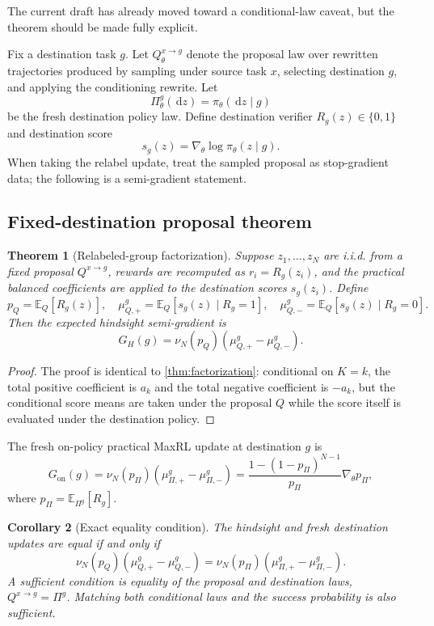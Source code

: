 \documentclass[11pt]{article}
\newcommand{\E}{\mathbb{E}}
\newcommand{\grad}{\nabla_{\!\theta}}
\newcommand{\dd}{\,\mathrm{d}}
\newtheorem{theorem}{Theorem}[section]
\newtheorem{corollary}[theorem]{Corollary}
\theoremstyle{definition}
\theoremstyle{remark}
\begin{document}
The current draft has already moved toward a conditional-law caveat, but the theorem should be made fully explicit.

Fix a destination task $g$. Let $Q_\theta^{x\to g}$ denote the proposal law over rewritten trajectories produced by sampling under source task $x$, selecting destination $g$, and applying the conditioning rewrite. Let
\[
\Pi_\theta^g(\dd z)=\pi_\theta(\dd z\mid g)
\]
be the fresh destination policy law. Define destination verifier $R_g(z)\in\{0,1\}$ and destination score
\[
s_g(z)=\grad\log\pi_\theta(z\mid g).
\]
When taking the relabel update, treat the sampled proposal as stop-gradient data; the following is a semi-gradient statement.

\subsection{Fixed-destination proposal theorem}

\begin{theorem}[Relabeled-group factorization]
\label{thm:relabel-factor}
Suppose $z_1,\ldots,z_N$ are i.i.d. from a fixed proposal $Q^{x\to g}$, rewards are recomputed as $r_i=R_g(z_i)$, and the practical balanced coefficients are applied to the destination scores $s_g(z_i)$. Define
\[
p_Q=\E_Q[R_g(z)],
\quad
\mu_{Q,+}^g=\E_Q[s_g(z)\mid R_g=1],
\quad
\mu_{Q,-}^g=\E_Q[s_g(z)\mid R_g=0].
\]
Then the expected hindsight semi-gradient is
\begin{equation}
G_H(g)
=\nu_N(p_Q)\left(\mu_{Q,+}^g-\mu_{Q,-}^g\right).
\label{eq:hindsight-semigrad}
\end{equation}
\end{theorem}

\begin{proof}
The proof is identical to \cref{thm:factorization}: conditional on $K=k$, the total positive coefficient is $a_k$ and the total negative coefficient is $-a_k$, but the conditional score means are taken under the proposal $Q$ while the score itself is evaluated under the destination policy.
\end{proof}

The fresh on-policy practical MaxRL update at destination $g$ is
\begin{equation}
G_{\mathrm{on}}(g)
=\nu_N(p_\Pi)
\left(\mu_{\Pi,+}^g-\mu_{\Pi,-}^g\right)
=\frac{1-(1-p_\Pi)^{N-1}}{p_\Pi}\grad p_\Pi,
\label{eq:fresh-destination}
\end{equation}
where $p_\Pi=\E_{\Pi^g}[R_g]$.

\begin{corollary}[Exact equality condition]
The hindsight and fresh destination updates are equal if and only if
\begin{equation}
\nu_N(p_Q)
\left(\mu_{Q,+}^g-\mu_{Q,-}^g\right)
=
\nu_N(p_\Pi)
\left(\mu_{\Pi,+}^g-\mu_{\Pi,-}^g\right).
\label{eq:equality-condition}
\end{equation}
A sufficient condition is equality of the proposal and destination laws, $Q^{x\to g}=\Pi^g$. Matching both conditional laws and the success probability is also sufficient.
\end{corollary}
\end{document}
